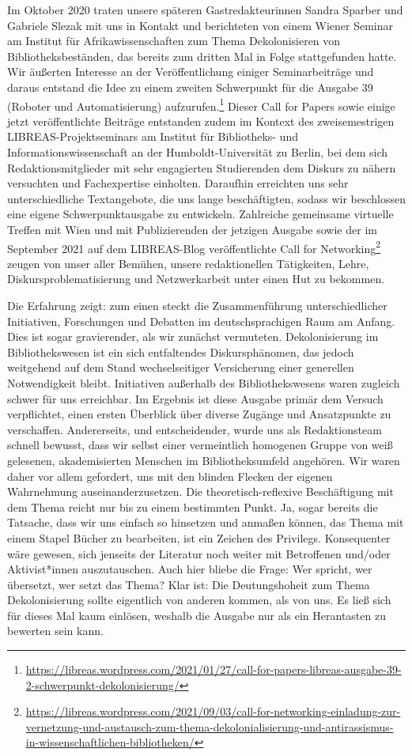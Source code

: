 \documentclass[a4paper,
fontsize=11pt,
oneside,
numbers=noperiodatend,
parskip=half-,
bibliography=totoc,
final
]{scrartcl}
\begin{document}
Im Oktober 2020 traten unsere späteren Gastredakteurinnen Sandra Sparber
und Gabriele Slezak mit uns in Kontakt und berichteten von einem Wiener
Seminar am Institut für Afrikawissenschaften zum Thema Dekolonisieren
von Bibliotheksbeständen, das bereits zum dritten Mal in Folge
stattgefunden hatte. Wir äußerten Interesse an der Veröffentlichung
einiger Seminarbeiträge und daraus entstand die Idee zu einem zweiten
Schwerpunkt für die Ausgabe 39 (Roboter und Automatisierung)
aufzurufen.\footnote{\url{https://libreas.wordpress.com/2021/01/27/call-for-papers-libreas-ausgabe-39-2-schwerpunkt-dekolonisierung/}}
Dieser Call for Papers sowie einige jetzt veröffentlichte Beiträge
entstanden zudem im Kontext des zweisemestrigen LIBREAS-Projektseminars
am Institut für Bibliotheks- und Informationswissenschaft an der
Humboldt-Universität zu Berlin, bei dem sich Redaktionsmitglieder mit
sehr engagierten Studierenden dem Diskurs zu nähern versuchten und
Fachexpertise einholten. Daraufhin erreichten uns sehr unterschiedliche
Textangebote, die uns lange beschäftigten, sodass wir beschlossen eine
eigene Schwerpunktausgabe zu entwickeln. Zahlreiche gemeinsame virtuelle
Treffen mit Wien und mit Publizierenden der jetzigen Ausgabe sowie der
im September 2021 auf dem LIBREAS-Blog veröffentlichte Call for
Networking\footnote{\url{https://libreas.wordpress.com/2021/09/03/call-for-networking-einladung-zur-vernetzung-und-austausch-zum-thema-dekolonialisierung-und-antirassismus-in-wissenschaftlichen-bibliotheken/}}
zeugen von unser aller Bemühen, unsere redaktionellen Tätigkeiten,
Lehre, Diskursproblematisierung und Netzwerkarbeit unter einen Hut zu
bekommen.

Die Erfahrung zeigt: zum einen steckt die Zusammenführung
unterschiedlicher Initiativen, Forschungen und Debatten im
deutschsprachigen Raum am Anfang. Dies ist sogar gravierender, als wir
zunächst vermuteten. Dekolonisierung im Bibliothekswesen ist ein sich
entfaltendes Diskursphänomen, das jedoch weitgehend auf dem Stand
wechselseitiger Versicherung einer generellen Notwendigkeit bleibt.
Initiativen außerhalb des Bibliothekswesens waren zugleich schwer für
uns erreichbar. Im Ergebnis ist diese Ausgabe primär dem Versuch
verpflichtet, einen ersten Überblick über diverse Zugänge und
Ansatzpunkte zu verschaffen. Andererseits, und entscheidender, wurde uns
als Redaktionsteam schnell bewusst, dass wir selbst einer vermeintlich
homogenen Gruppe von weiß gelesenen, akademisierten Menschen im
Bibliotheksumfeld angehören. Wir waren daher vor allem gefordert, uns
mit den blinden Flecken der eigenen Wahrnehmung auseinanderzusetzen. Die
theoretisch-reflexive Beschäftigung mit dem Thema reicht nur bis zu
einem bestimmten Punkt. Ja, sogar bereits die Tatsache, dass wir uns
einfach so hinsetzen und anmaßen können, das Thema mit einem Stapel
Bücher zu bearbeiten, ist ein Zeichen des Privilegs. Konsequenter wäre
gewesen, sich jenseits der Literatur noch weiter mit Betroffenen
und/oder Aktivist*innen auszutauschen. Auch hier bliebe die Frage: Wer
spricht, wer übersetzt, wer setzt das Thema? Klar ist: Die
Deutungshoheit zum Thema Dekolonisierung sollte eigentlich von anderen
kommen, als von uns. Es ließ sich für dieses Mal kaum einlösen, weshalb
die Ausgabe nur als ein Herantasten zu bewerten sein kann.
\end{document}
